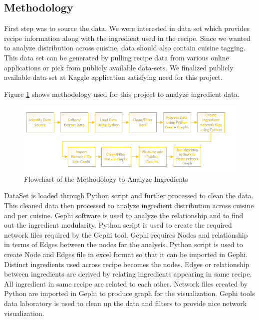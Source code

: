 \documentclass[sigconf]{acmart}
\begin{document}
\subsection{Methodology}
First step was to source the data. We were interested in data set which provides recipe information along with the ingredient used in the recipe. Since we wanted to analyze distribution across cuisine, data should also contain cuisine tagging. This data set can be generated by pulling recipe data from various online applications or pick from publicly available data-sets. We finalized publicly available data-set at Kaggle application satisfying need for this project.

Figure \ref{f:methodology} shows methodology used for this project to analyze ingredient data.
\begin{figure}[!ht]
  \centering\includegraphics[width=\columnwidth]{images/methodology.PNG}
  \caption{Flowchart of the Methodology to Analyze Ingredients }\label{f:methodology}
\end{figure}

DataSet is loaded through Python script and further processed to clean the data. This cleaned data then processed to analyze ingredient distribution across cuisine and per cuisine. Gephi software is used to analyze the relationship and to find out the ingredient modularity. Python script is used to create the required network files required by the Gephi tool. Gephi requires Nodes and relationship in terms of Edges between the nodes for the analysis. Python script is used to create Node and Edges file in excel format so that it can be imported in Gephi. Distinct ingredients used across recipe becomes the nodes. Edges or relationship between ingredients are derived by relating ingredients appearing in same recipe. All ingredient in same recipe are related to each other.
Network files created by Python are imported in Gephi to produce graph for the visualization. Gephi tools data laboratory is used to clean up the data and filters to provide nice network visualization. 
\end{document}
